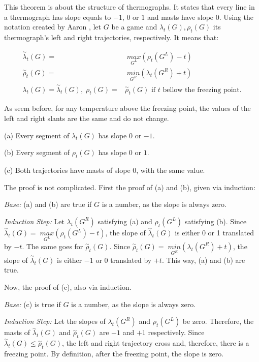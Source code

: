 This theorem is about the structure of thermographs. It states that every line in a thermograph has slope equals to ${-}1$, $0$ or $1$ and masts have slope 0. Using the notation created by Aaron \cite{CGT}, let $G$ be a game and $\lambda_t(G), \rho_t(G)$ its thermograph's left and right trajectories, respectively. It means that:

\begin{align*}
\overset{\sim}{\lambda}_t(G) =&\; \underset{G^L}{max}(\rho_t(G^L)- t)\\
\overset{\sim}{\rho}_t(G) =&\; \underset{G^R}{min}(\lambda_t(G^R) + t)\\
\lambda_t(G) = \overset{\sim}{\lambda}_t(G),\;\rho_t(G) =& \overset{\sim}{\rho}_t(G)\text{ if $t$ bellow the freezing point.}
\end{align*}

As seem before, for any temperature above the freezing point, the values of the left and right slants are the same and do not change. 

(a) Every segment of $\lambda_t(G)$ has slope 0 or ${-}1$.

(b) Every segment of $\rho_t(G)$ has slope 0 or $1$.

(c) Both trajectories have masts of slope 0, with the same value.

The proof is not complicated. First the proof of (a) and (b), given via induction:

\textit{Base:} (a) and (b) are true if $G$ is a number, as the slope is always zero.

\textit{Induction Step:} Let $\lambda_t(G^R)$ satisfying (a) and $\rho_t(G^L)$ satisfying (b). Since \mbox{$\overset{\sim}{\lambda}_t(G) =\; \underset{G^L}{max}(\rho_t(G^L)- t)$}, the slope of $\overset{\sim}{\lambda}_t(G)$ is either 0 or 1 translated by ${-}t$. The same goes for $\overset{\sim}{\rho}_t(G)$. Since \mbox{$\overset{\sim}{\rho}_t(G) =\; \underset{G^R}{min}(\lambda_t(G^R) + t)$}, the slope of $\overset{\sim}{\lambda}_t(G)$ is either ${-}1$ or 0 translated by ${+}t$. This way, (a) and (b) are true.

Now, the proof of (c), also via induction.

\textit{Base:} (c) is true if $G$ is a number, as the slope is always zero.

\textit{Induction Step:} Let the slopes of $\lambda_t(G^R)$ and $\rho_t(G^L)$ be zero. Therefore, the masts of $\overset{\sim}{\lambda}_t(G)$ and $\overset{\sim}{\rho}_t(G)$ are ${-}1$ and ${+}1$ respectively. Since $\overset{\sim}{\lambda}_t(G) \leq \overset{\sim}{\rho}_t(G)$, the left and right trajectory cross and, therefore, there is a freezing point. By definition, after the freezing point, the slope is zero.

